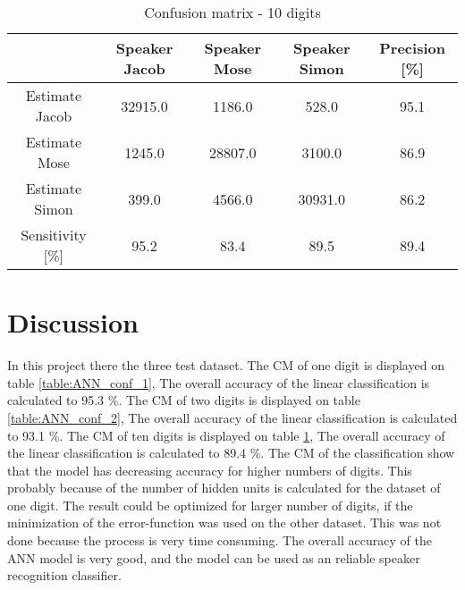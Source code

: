 \begin{table}[H]                                                    
\centering                                                          
\begin{tabular}{|c|c|c|c|c|}                                        
\hline                                                              
  & Speaker Jacob & Speaker Mose & Speaker Simon & Precision [\%] \\
\hline                                                              
Estimate Jacob & 32915.0 & 1186.0 & 528.0 & 95.1 \\                 
\hline                                                              
Estimate Mose & 1245.0 & 28807.0 & 3100.0 & 86.9 \\                 
\hline                                                              
Estimate Simon & 399.0 & 4566.0 & 30931.0 & 86.2 \\                 
\hline                                                              
Sensitivity [\%] & 95.2 & 83.4 & 89.5 & 89.4 \\                     
\hline                                                              
\end{tabular}                                                       
\caption{Confusion matrix - 10 digits}                              
\label{table:ANN_conf_10}                                           
\end{table}


\section{Discussion}
In this project there the three test dataset.
The CM of one digit is displayed on table \ref{table:ANN_conf_1}, The overall accuracy of the linear classification is  calculated to 95.3 \%.
The CM of two digits is displayed on table \ref{table:ANN_conf_2}, The overall accuracy of the linear classification is  calculated to 93.1 \%.
The CM of ten digits is displayed on table \ref{table:ANN_conf_10}, The overall accuracy of the linear classification is  calculated to 89.4 \%.
The CM of the classification show that the model has decreasing accuracy for higher numbers of digits.
This probably because of the number of hidden units is calculated for the dataset of one digit.
The result could be optimized for larger number of digits, if the minimization of the  error-function was used on the other dataset.
This was not done because the process is very time consuming. 
The overall accuracy of the ANN model is very good, and the model can be used as an reliable speaker recognition classifier.    
